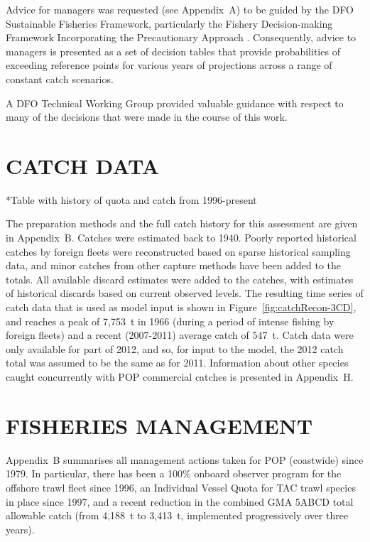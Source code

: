 Advice for managers was requested (see Appendix~A) to be guided by the DFO Sustainable Fisheries Framework, particularly the Fishery Decision-making Framework Incorporating the Precautionary Approach . Consequently, advice to managers is presented as a set of decision tables that provide probabilities of exceeding reference points for various years of projections across a range of constant catch scenarios. 

A DFO Technical Working Group provided valuable guidance with respect to many of the decisions that were made in the course of this work.

\section{CATCH DATA}
*Table with history of quota and catch from 1996-present

The preparation methods and the full catch history for this assessment are given in Appendix~B. Catches were estimated back to 1940. Poorly reported historical catches by foreign fleets were reconstructed based on sparse historical sampling data, and minor catches from other capture methods have been added to the totals. All available discard estimates were added to the catches, with estimates of historical discards based on current observed levels. The resulting time series of catch data that is used as model input is shown in Figure~\ref{fig:catchRecon-3CD}, and reaches a peak of 7,753~t in 1966 (during a period of intense fishing by foreign fleets) and a recent (2007-2011) average catch of 547~t. Catch data were only available for part of 2012, and so, for input to the model, the 2012 catch total was assumed to be the same as for 2011. Information about other species caught concurrently with POP commercial catches is presented in Appendix~H.

\section{FISHERIES MANAGEMENT}

Appendix~B summarises all management actions taken for POP (coastwide) since 1979. In particular, there has been a 100\% onboard observer program for the offshore trawl fleet since 1996, an Individual Vessel Quota for TAC trawl species in place since 1997, and a recent reduction in the combined GMA 5ABCD total allowable catch (from 4,188~t to 3,413~t, implemented progressively over three years).

\vspace{15mm}   %

